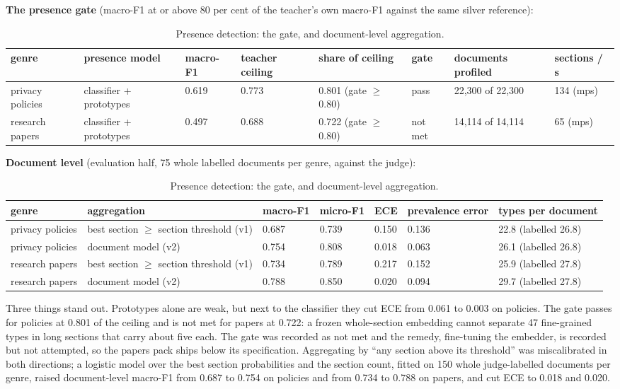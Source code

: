 \documentclass[11pt,a4paper]{article}
\newcommand{\panel}[1]{\par\medskip\noindent #1\par\smallskip}
\begin{document}
\begin{table}[!htbp]
\centering\small
\panel{\textbf{The presence gate} (macro-F1 at or above 80 per cent of the teacher's own macro-F1 against the same silver reference):}
\begin{adjustbox}{max width=\linewidth}
\begin{tabular}{llllllll}
\toprule
genre & presence model & macro-F1 & teacher ceiling & share of ceiling & gate & documents profiled & sections / s \\
\midrule
privacy policies & classifier + prototypes & 0.619 & 0.773 & 0.801 (gate $\geq$ 0.80) & pass & 22,300 of 22,300 & 134 (mps) \\
research papers & classifier + prototypes & 0.497 & 0.688 & 0.722 (gate $\geq$ 0.80) & not met & 14,114 of 14,114 & 65 (mps) \\
\bottomrule
\end{tabular}
\end{adjustbox}
\panel{\textbf{Document level} (evaluation half, 75 whole labelled documents per genre, against the judge):}
\begin{adjustbox}{max width=\linewidth}
\begin{tabular}{lllllll}
\toprule
genre & aggregation & macro-F1 & micro-F1 & ECE & prevalence error & types per document \\
\midrule
privacy policies & best section $\geq$ section threshold (v1) & 0.687 & 0.739 & 0.150 & 0.136 & 22.8 (labelled 26.8) \\
privacy policies & document model (v2) & 0.754 & 0.808 & 0.018 & 0.063 & 26.1 (labelled 26.8) \\
research papers & best section $\geq$ section threshold (v1) & 0.734 & 0.789 & 0.217 & 0.152 & 25.9 (labelled 27.8) \\
research papers & document model (v2) & 0.788 & 0.850 & 0.020 & 0.094 & 29.7 (labelled 27.8) \\
\bottomrule
\end{tabular}
\end{adjustbox}
\caption{Presence detection: the gate, and document-level aggregation.}
\end{table}

Three things stand out. Prototypes alone are weak, but next to the classifier they cut ECE from 0.061 to 0.003 on policies.  The gate passes for policies at 0.801 of the ceiling and is not met for papers at 0.722: a frozen whole-section embedding cannot separate 47 fine-grained types in long sections that carry about five each.  The gate was recorded as not met and the remedy, fine-tuning the embedder, is recorded but not attempted, so the papers pack ships below its specification. Aggregating by ``any section above its threshold'' was miscalibrated in both directions; a logistic model over the best section probabilities and the section count, fitted on 150 whole judge-labelled documents per genre, raised document-level macro-F1 from 0.687 to 0.754 on policies and from 0.734 to 0.788 on papers, and cut ECE to 0.018 and 0.020.
\end{document}
